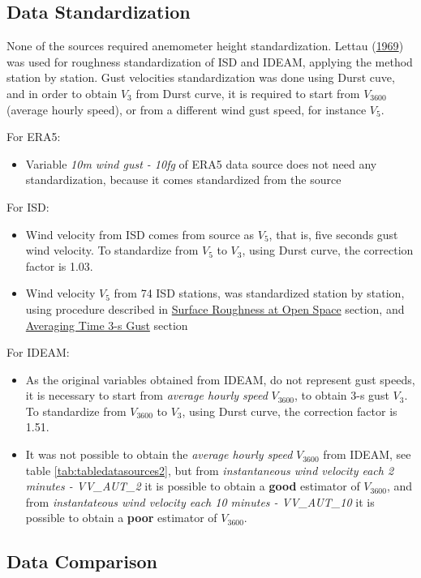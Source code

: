 \documentclass[12pt,oneside]{reedthesis}
\providecommand{\tightlist}{%
  \setlength{\itemsep}{0pt}\setlength{\parskip}{0pt}}
\begin{document}
\hypertarget{data-standardization-1}{%
\subsection{Data Standardization}\label{data-standardization-1}}

None of the sources required anemometer height standardization. Lettau (\protect\hyperlink{ref-Lettau1969}{1969}) was used for roughness standardization of ISD and IDEAM, applying the method station by station. Gust velocities standardization was done using Durst cuve, and in order to obtain \(V_3\) from Durst curve, it is required to start from \(V_{3600}\) (average hourly speed), or from a different wind gust speed, for instance \(V_5\).

For ERA5:
\begin{itemize}
\tightlist
\item
  Variable \emph{10m wind gust - 10fg} of ERA5 data source does not need any standardization, because it comes standardized from the source
\end{itemize}
For ISD:
\begin{itemize}
\item
  Wind velocity from ISD comes from source as \(V_5\), that is, five seconds gust wind velocity. To standardize from \(V_5\) to \(V_3\), using Durst curve, the correction factor is 1.03.
\item
  Wind velocity \(V_5\) from 74 ISD stations, was standardized station by station, using procedure described in \protect\hyperlink{rmd-roughness}{Surface Roughness at Open Space} section, and \protect\hyperlink{rmd-gust}{Averaging Time 3-s Gust} section
\end{itemize}
For IDEAM:
\begin{itemize}
\item
  As the original variables obtained from IDEAM, do not represent gust speeds, it is necessary to start from \emph{average hourly speed} \(V_{3600}\), to obtain 3-s gust \(V_3\). To standardize from \(V_{3600}\) to \(V_3\), using Durst curve, the correction factor is 1.51.
\item
  It was not possible to obtain the \emph{average hourly speed} \(V_{3600}\) from IDEAM, see table \ref{tab:tabledatasources2}, but from \emph{instantaneous wind velocity each 2 minutes - VV\_AUT\_2} it is possible to obtain a \textbf{good} estimator of \(V_{3600}\), and from \emph{instantateous wind velocity each 10 minutes - VV\_AUT\_10} it is possible to obtain a \textbf{poor} estimator of \(V_{3600}\).
\end{itemize}
\hypertarget{data-comparison}{%
\subsection{Data Comparison}\label{data-comparison}}
\end{document}
